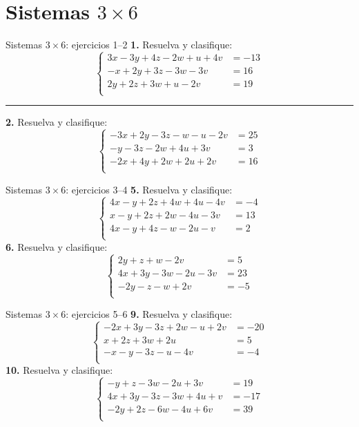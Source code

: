 \documentclass[aspectratio=169,9pt]{beamer}
\theoremstyle{remark}
\begin{document}
\section{Sistemas $3\times 6$}
\begin{frame}{Sistemas $3\times 6$: ejercicios 1--2}
\scriptsize
\textbf{1.} Resuelva y clasifique:
\[\left\{\begin{aligned}
3x-3y+4z-2w+u+4v&=-13\\
-x+2y+3z-3w-3v&=16\\
2y+2z+3w+u-2v&=19\\
\end{aligned}\right.\]
\vspace{0.2em}\hrule\vspace{0.3em}
\textbf{2.} Resuelva y clasifique:
\[\left\{\begin{aligned}
-3x+2y-3z-w-u-2v&=25\\
-y-3z-2w+4u+3v&=3\\
-2x+4y+2w+2u+2v&=16\\
\end{aligned}\right.\]
\end{frame}
\begin{frame}{Sistemas $3\times 6$: ejercicios 3--4}
\scriptsize
\textbf{5.} Resuelva y clasifique:
\[\left\{\begin{aligned}
4x-y+2z+4w+4u-4v&=-4\\
x-y+2z+2w-4u-3v&=13\\
4x-y+4z-w-2u-v&=2\\
\end{aligned}\right.\]
\textbf{6.} Resuelva y clasifique:
\[\left\{\begin{aligned}
2y+z+w-2v&=5\\
4x+3y-3w-2u-3v&=23\\
-2y-z-w+2v&=-5\\
\end{aligned}\right.\]
\end{frame}
\begin{frame}{Sistemas $3\times 6$: ejercicios 5--6}
\scriptsize
\textbf{9.} Resuelva y clasifique:
\[\left\{\begin{aligned}
-2x+3y-3z+2w-u+2v&=-20\\
x+2z+3w+2u&=5\\
-x-y-3z-u-4v&=-4\\
\end{aligned}\right.\]
\textbf{10.} Resuelva y clasifique:
\[\left\{\begin{aligned}
-y+z-3w-2u+3v&=19\\
4x+3y-3z-3w+4u+v&=-17\\
-2y+2z-6w-4u+6v&=39\\
\end{aligned}\right.\]
\end{frame}
\end{document}
